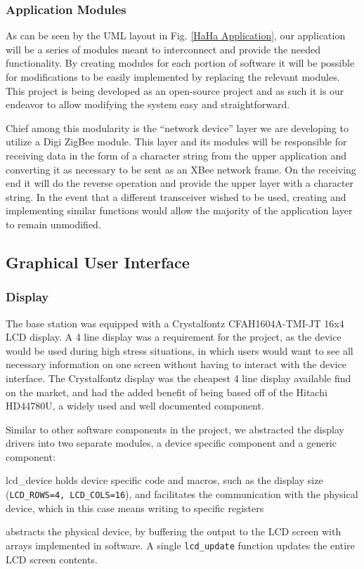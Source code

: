 \documentclass[journal,compsoc]{IEEEtran}
\begin{document}
\subsubsection{Application Modules}

As can be seen by the UML layout in Fig. \ref{HaHa Application}, our application will be a series of modules meant to interconnect and provide the needed functionality. By creating modules for each portion of software it will be possible for modifications to be easily implemented by replacing the relevant modules. This project is being developed as an open-source project and as such it is our endeavor to allow modifying the system easy and straightforward.

Chief among this modularity is the “network device” layer we are developing to utilize a Digi ZigBee module. This layer and its modules will be responsible for receiving data in the form of a character string from the upper application and converting it as necessary to be sent as an XBee network frame. On the receiving end it will do the reverse operation and provide the upper layer with a character string. In the event that a different transceiver wished to be used, creating and implementing similar functions would allow the majority of the application layer to remain unmodified.

\subsection{Graphical User Interface}
\subsubsection{Display}

The base station was equipped with a Crystalfontz CFAH1604A-TMI-JT 16x4 LCD display. A 4 line display was a requirement for the project, as the device would be used during high stress situations, in which users would want to see all necessary information on one screen without having to interact with the device interface. The Crystalfontz display was the cheapest 4 line display available find on the market, and had the added benefit of being based off of the Hitachi HD44780U, a widely used and well documented component.

Similar to other software components in the project, we abstracted the display drivers into two separate modules, a device specific component and a generic component:

\begin{LaTeXdescription}
	\item[lcd\_device] holds device specific code and macros, such as the display size (\lstinline[columns=fixed]{LCD_ROWS=4, LCD_COLS=16}), and facilitates the communication with the physical device, which in this case means writing to specific registers
    \item[lcd] abstracts the physical device, by buffering the output to the LCD screen with arrays implemented in software. A single \lstinline[columns=fixed]{lcd_update} function updates the entire LCD screen contents.
\end{LaTeXdescription}
\end{document}
